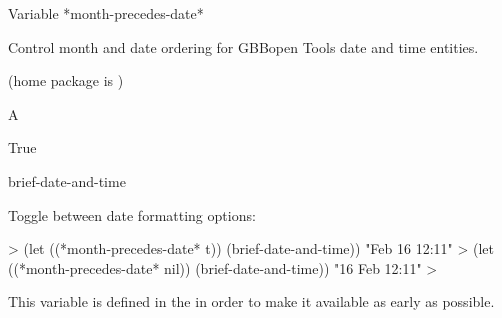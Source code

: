 \documentclass[10pt,twoside,english,pdftex]{article}
\begin{document}
\begin{functiondoc}{Variable}%
{*month-precedes-date*}{}%

\fnsyntax

\fnpurpose Control month and date ordering for GBBopen Tools date and time
entities.

\fnpackage {} (home package is )

\fnmodule {}

\fnvaluetype A 

\fninitialvalue True

\begin{alsos}{brief-date-and-time}
\end{alsos}

\fnexamples
Toggle between date formatting options:
%
\W\supp
\begin{example}
  > (let ((*month-precedes-date* t))
      (brief-date-and-time))
  "Feb 16 12:11"
  > (let ((*month-precedes-date* nil))
      (brief-date-and-time))
  "16 Feb 12:11"
  >
\end{example}

\fnnote
{}%
%
%
This variable is defined in the  
in order to make it available as early as possible.

\end{functiondoc}

\end{document}
